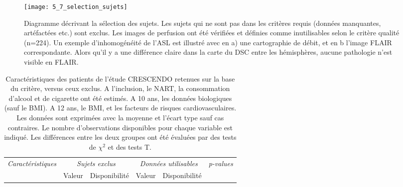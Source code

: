 \begin{figure}[!t]
\centering
\texttt{[image: 5\_7\_selection\_sujets]}
\caption{Diagramme décrivant la sélection des sujets. Les sujets qui ne sont pas dans les critères requis (données
manquantes, artéfactées etc.) sont exclus. Les images de perfusion ont été vérifiées et définies comme inutilisables selon le
critère qualité (n=224). Un exemple d’inhomogénéité de l’ASL est illustré avec en a) une cartographie de débit, et en b
l’image FLAIR correspondante. Alors qu’il y a une différence claire dans la carte du DSC entre les hémisphères, aucune
pathologie n’est visible en FLAIR.}
\label{fig:5_7_selection_sujets}	
\end{figure}
\begin {table}
\caption{Caractéristiques des patients de l’étude CRESCENDO retenues sur la base du critère, versus ceux exclus. A
l’inclusion, le NART, la consommation d’alcool et de cigarette ont été estimés. A 10 ans, les données biologiques (sauf le
BMI). A 12 ans, le BMI, et les facteurs de risques cardiovasculaires. Les données sont exprimées avec la moyenne et l’écart
type sauf cas contraires. Le nombre d’observations disponibles pour chaque variable est indiqué. Les différences entre les
deux groupes ont été évaluées par des tests de $\chi^2$ et des tests T.} 
\label{tab:crescendo} 
\centering
\begin{tabularx}{17cm}{X | c c c c c}
	{\em Caractéristiques } & 
	\multicolumn{2}{c}{{\em Sujets exclus}} &
	\multicolumn{2}{c}{{\em Données utilisables}} &
	{\em p-values}\\
	 & Valeur & Disponibilité & Valeur & Disponibilité & \\


\end{tabularx}
\end{table}
